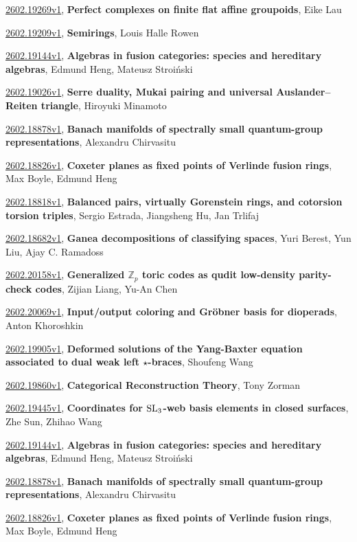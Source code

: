\documentclass[9pt, a4paper]{article}
\theoremstyle{plain}
\theoremstyle{definition}
\theoremstyle{remark}
\newcommand{\arxiv}[3]{\href{https://arxiv.org/abs/#1}{#1}, \textbf{\textcolor{arxivblue}{#2}}, #3}
\begin{document}
\arxiv{2602.19269v1}{Perfect complexes on finite flat affine groupoids}{Eike Lau}

\arxiv{2602.19209v1}{Semirings}{Louis Halle Rowen}

\arxiv{2602.19144v1}{Algebras in fusion categories: species and hereditary algebras}{Edmund Heng, Mateusz Stroiński}

\arxiv{2602.19026v1}{Serre duality, Mukai pairing and universal Auslander--Reiten triangle}{Hiroyuki Minamoto}

\arxiv{2602.18878v1}{Banach manifolds of spectrally small quantum-group representations}{Alexandru Chirvasitu}

\arxiv{2602.18826v1}{Coxeter planes as fixed points of Verlinde fusion rings}{Max Boyle, Edmund Heng}

\arxiv{2602.18818v1}{Balanced pairs, virtually Gorenstein rings, and cotorsion torsion triples}{Sergio Estrada, Jiangsheng Hu, Jan Trlifaj}

\arxiv{2602.18682v1}{Ganea decompositions of classifying spaces}{Yuri Berest, Yun Liu, Ajay C. Ramadoss}

\arxiv{2602.20158v1}{Generalized $\mathbb{Z}_p$ toric codes as qudit low-density parity-check codes}{Zijian Liang, Yu-An Chen}

\arxiv{2602.20069v1}{Input/output coloring and Gröbner basis for dioperads}{Anton Khoroshkin}

\arxiv{2602.19905v1}{Deformed solutions of the Yang-Baxter equation associated to dual weak left $\star$-braces}{Shoufeng Wang}

\arxiv{2602.19860v1}{Categorical Reconstruction Theory}{Tony Zorman}

\arxiv{2602.19445v1}{Coordinates for ${\rm SL}_3$-web basis elements in closed surfaces}{Zhe Sun, Zhihao Wang}

\arxiv{2602.19144v1}{Algebras in fusion categories: species and hereditary algebras}{Edmund Heng, Mateusz Stroiński}

\arxiv{2602.18878v1}{Banach manifolds of spectrally small quantum-group representations}{Alexandru Chirvasitu}

\arxiv{2602.18826v1}{Coxeter planes as fixed points of Verlinde fusion rings}{Max Boyle, Edmund Heng}

\end{document}
